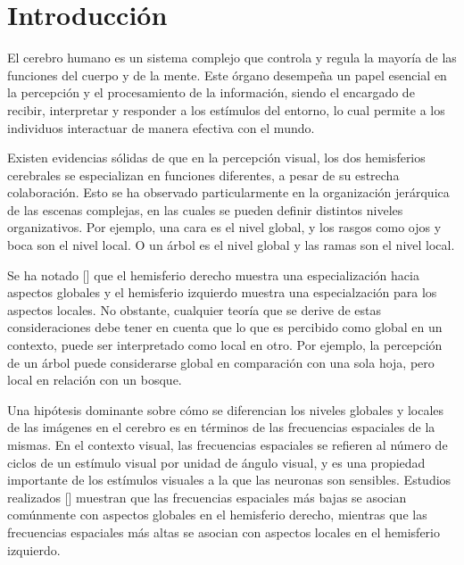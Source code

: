 \chapter*{Introducción}\label{chapter:introduction}

El cerebro humano es un sistema complejo que controla y regula la mayoría de las funciones del cuerpo y de la mente. Este órgano desempeña un papel esencial en la percepción y el procesamiento de la información, siendo el encargado de recibir, interpretar y responder a los estímulos del entorno, lo cual permite a los individuos interactuar de manera efectiva con el mundo. 

Existen evidencias s\'olidas de que en la percepción visual, los dos hemisferios cerebrales se especializan en funciones diferentes, a pesar de su estrecha colaboraci\'on. Esto se ha observado particularmente en la organizaci\'on jer\'arquica de las escenas complejas, en las cuales se pueden definir distintos niveles organizativos.  Por ejemplo, una cara es el nivel global, y los rasgos como ojos y boca son el nivel local. O un \'arbol es el nivel global y las ramas son el nivel local.

 Se ha notado [\cite{flevaris_spatial_2016}] que el hemisferio derecho muestra una especializaci\'on hacia aspectos globales  y el hemisferio izquierdo muestra una especialzaci\'on para los aspectos locales. No obstante, cualquier teoría que se derive de estas consideraciones debe tener en cuenta que lo que es percibido como global en un contexto, puede ser interpretado  como local en otro. Por ejemplo, la percepción de un árbol puede considerarse global en comparación con una sola hoja, pero local en relación con un bosque.

Una hipótesis dominante sobre cómo se diferencian los niveles globales y locales de las im\'agenes en el  cerebro es en términos de las frecuencias espaciales de la mismas. En el contexto visual, las frecuencias espaciales se refieren al número de ciclos de un estímulo visual por unidad de ángulo visual, y es una propiedad importante de los estímulos visuales a la que las neuronas son sensibles. Estudios realizados [\cite{flevaris_spatial_2016}] muestran que las frecuencias espaciales más bajas se asocian comúnmente con aspectos globales en el hemisferio derecho, mientras que las frecuencias espaciales más altas se asocian con aspectos locales en el hemisferio izquierdo. 



